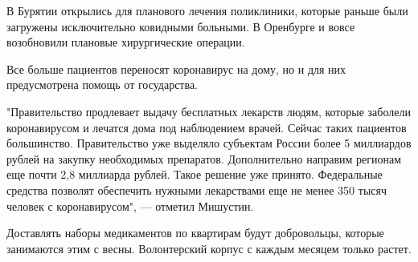 В Бурятии открылись для планового лечения поликлиники, которые раньше были
загружены исключительно ковидными больными. В Оренбурге и вовсе возобновили
плановые хирургические операции.

Все больше пациентов переносят коронавирус на дому, но и для них предусмотрена
помощь от государства.

"Правительство продлевает выдачу бесплатных лекарств людям, которые
заболели коронавирусом и лечатся дома под наблюдением врачей. Сейчас таких
пациентов большинство. Правительство уже выделяло субъектам России более 5
миллиардов рублей на закупку необходимых препаратов. Дополнительно направим
регионам еще почти 2,8 миллиарда рублей. Такое решение уже принято.
Федеральные средства позволят обеспечить нужными лекарствами еще не менее
350 тысяч человек с коронавирусом", — отметил Мишустин.

Доставлять наборы медикаментов по квартирам будут добровольцы, которые
занимаются этим с весны. Волонтерский корпус с каждым месяцем только растет.
